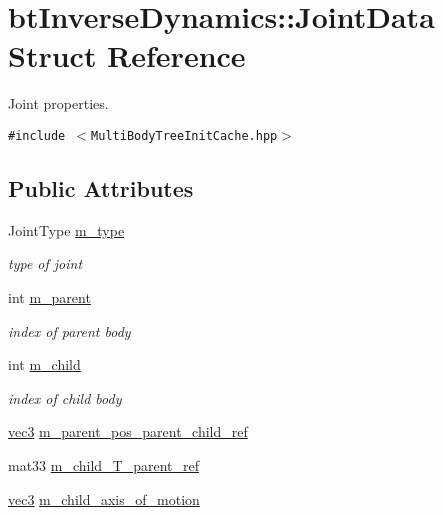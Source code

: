 \hypertarget{structbt_inverse_dynamics_1_1_joint_data}{
\section{btInverseDynamics::JointData Struct Reference}
\label{structbt_inverse_dynamics_1_1_joint_data}
}
Joint properties.  


{\tt \#include $<$MultiBodyTreeInitCache.hpp$>$}

\subsection*{Public Attributes}
\begin{CompactItemize}
\item 
\hypertarget{structbt_inverse_dynamics_1_1_joint_data_a1137097b6a384ab20ff337ec971f952}{
JointType \hyperlink{structbt_inverse_dynamics_1_1_joint_data_a1137097b6a384ab20ff337ec971f952}{m\_\-type}}
\label{structbt_inverse_dynamics_1_1_joint_data_a1137097b6a384ab20ff337ec971f952}

\begin{CompactList}\small\item\em type of joint \item\end{CompactList}\item 
\hypertarget{structbt_inverse_dynamics_1_1_joint_data_9e2e885cfba7ba0f984a5c56dd78118d}{
int \hyperlink{structbt_inverse_dynamics_1_1_joint_data_9e2e885cfba7ba0f984a5c56dd78118d}{m\_\-parent}}
\label{structbt_inverse_dynamics_1_1_joint_data_9e2e885cfba7ba0f984a5c56dd78118d}

\begin{CompactList}\small\item\em index of parent body \item\end{CompactList}\item 
\hypertarget{structbt_inverse_dynamics_1_1_joint_data_7ba728d0c348f3ef533d17c44a6526cf}{
int \hyperlink{structbt_inverse_dynamics_1_1_joint_data_7ba728d0c348f3ef533d17c44a6526cf}{m\_\-child}}
\label{structbt_inverse_dynamics_1_1_joint_data_7ba728d0c348f3ef533d17c44a6526cf}

\begin{CompactList}\small\item\em index of child body \item\end{CompactList}\item 
\hyperlink{classbt_inverse_dynamics_1_1vec3}{vec3} \hyperlink{structbt_inverse_dynamics_1_1_joint_data_56c1cd9b4021ca0c202cd059e0759993}{m\_\-parent\_\-pos\_\-parent\_\-child\_\-ref}
\item 
mat33 \hyperlink{structbt_inverse_dynamics_1_1_joint_data_6725b907ac280e9fd3d1fa8f0032fda4}{m\_\-child\_\-T\_\-parent\_\-ref}
\item 
\hyperlink{classbt_inverse_dynamics_1_1vec3}{vec3} \hyperlink{structbt_inverse_dynamics_1_1_joint_data_e237c62f233031b18eec950090a1f576}{m\_\-child\_\-axis\_\-of\_\-motion}
\end{CompactItemize}


